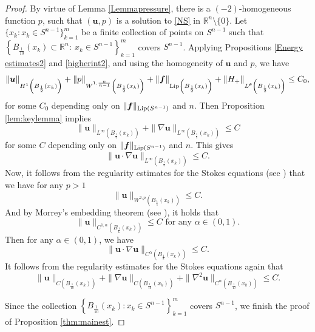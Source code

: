 \documentclass[12pt]{amsart}
\newcommand{\Bu}{{\boldsymbol{u}}}
\newcommand{\Bf}{{\boldsymbol{f}}}
\begin{document}
\begin{proof}
	By virtue of Lemma \ref{Lemmapressure}, there is a $(-2)$-homogeneous function $p$, such that $(\Bu, p)$ is  a solution to \eqref{NS} in $\mathbb{R}^n \setminus \{0\}$. Let $\{x_k: x_k \in S^{n-1}\}_{k=1}^m$ be a finite collection of points on $S^{n-1}$ such that $\left\{B_{\frac{1}{10}} (x_k)\subset \mathbb{R}^n:\ x_k \in S^{n-1}\right\}_{k=1}^m $  covers $S^{n-1}$.  Applying Propositions 
	\ref{Energy estimates2} and \ref{higherint2}, 
	and using the homogeneity of $\Bu$ and $p$, we have 
	\begin{equation*}
		\|\Bu\|_{H^1\left(B_{\frac12}(x_k)\right)} +\|p\|_{W^{1,\frac{n}{n-1}}\left(B_{\frac12}(x_k)\right)} + \|\Bf\|_{\textnormal{Lip}\left(B_{\frac12}(x_k)\right)} + \|H_+\|_{L^{\theta}\left(B_{\frac12}(x_k)\right)} \leq C_0,
	\end{equation*}
	for some $C_0$ depending only on $\|\Bf\|_{\textnormal{Lip}(S^{n-1})}$ and $n$. 
	Then  Proposition \ref{lem:keylemma}   implies
	\begin{equation*}
		\|\Bu\|_{L^{\infty}\left(B_{\frac14}(x_k)\right)} + 	\|\nabla\Bu\|_{L^{\infty}\left(B_{\frac14}(x_k)\right)}  \leq C
	\end{equation*}
	for some $C$ depending only on $\|\Bf\|_{\textnormal{Lip}(S^{n-1})}$ and $n$.
	This gives
	\[\|\Bu \cdot \nabla \Bu\|_{L^{\infty}\left(B_{\frac14}(x_k)\right)} \leq C.\]
	Now, it follows from the regularity estimates for the Stokes equations (see \cite[Lemma 2.12]{Tsai18}) that we have for any $p>1$
	\begin{equation*}
		\|\Bu\|_{W^{2,p}\left(B_{\frac15}(x_k)\right)}\leq C.
	\end{equation*}
	And by Morrey's embedding theorem (see \cite[Theorem 7.26]{GilbargTrudinger}), it holds that
	\begin{equation*}
		\|\Bu\|_{C^{1,\alpha}\left(B_{\frac16}(x_k)\right)}\leq C \textrm{ for any } \alpha \in (0,1).
	\end{equation*} 
	Then for any $\alpha\in (0,1)$, we have
	\[\|\Bu \cdot \nabla \Bu\|_{C^{\alpha}\left(B_{\frac{1}{8}}(x_k)\right)}\leq C.\]
	It follows from the regularity estimates for the Stokes equations again that \begin{equation*}
		\|\Bu\|_{C\left(B_{\frac{1}{10}}(x_k)\right)} + \|\nabla \Bu\|_{C\left(B_{\frac{1}{10}}(x_k)\right)} + \|\nabla^2 \Bu\|_{C^{\alpha}\left(B_{\frac{1}{10}}(x_k)\right)}\leq C.
	\end{equation*}
	
	Since the collection $\left\{B_{\frac{1}{10}} (x_k):x_k \in S^{n-1}\right\}_{k=1}^m $ covers $S^{n-1}$, we finish the proof of Proposition \ref{thm:mainest}.
\end{proof}
\end{document}
